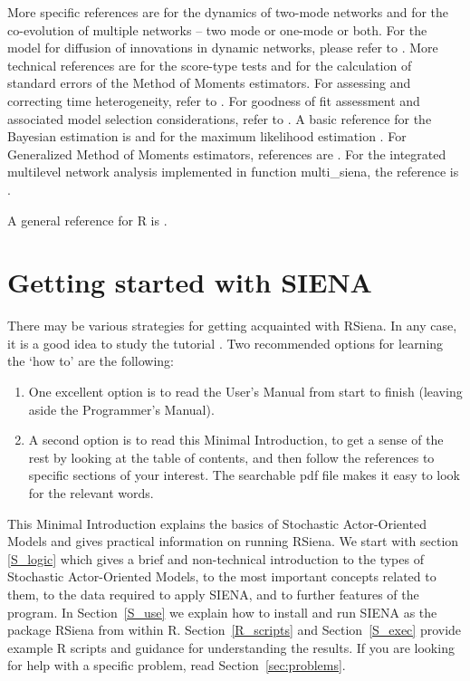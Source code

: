 \documentclass[a4paper,fleqn,11pt]{article}
\newcommand{\+}{\, + \,}
\newcommand{\sfn}[1]{\textsf{#1}}
\newcommand{\R}{{\sf R }}
\newcommand{\Rn}{{\sf R}}
\newcommand{\rs}{{\sf RSiena}}
\newcommand{\RS}{{\sf \textsf{RSiena} }}
\newcommand{\SI}{{\sf SIENA }}
\newcommand{\si}{{\sf SIENA}}
\newcommand{\saom}{{Stochastic Actor-Oriented Model}}
\begin{document}
More specific references are \citet{KoskinenEdling2012} for the
dynamics of two-mode networks and \citet{SLT2013} for the
co-evolution of multiple networks -- two mode or one-mode or both.
For the model for diffusion of innovations in dynamic networks,
please refer to \citet{Greenan15}.
More technical references are
\citet{Schweinberger12} for the score-type tests
and \citet{SchweinbergerSnijders07a} for the calculation of
standard errors of the Method of Moments estimators.
For assessing and correcting time heterogeneity, refer to
\citet*{Lospinoso2011}.
For goodness of fit assessment and associated model
selection considerations, refer to \citet{LospinosoSnijders2019}.
A basic reference for the Bayesian estimation is \citet{KoskinenSnijders07}
and for the maximum likelihood estimation \citet*{SnijdersEA10a}.
For Generalized Method of Moments estimators,
references are \citet*{ASS2015,ASS2019}.
For the integrated multilevel network analysis implemented
in function \sfn{multi\_siena}, the reference is \citet{KoskinenSnijders2023}.
\smallskip

A general reference for \R is \citet{R}.


\newpage

\section{Getting started with \SI}
\label{S_minsi1}

There may be various strategies for getting acquainted with \rs.
In any case, it is a good idea to study the tutorial  \citet{SnijdersEA10b}.
Two recommended options for learning the `how to' are the following:
\begin{enumerate}
\item One excellent option is to read the User's Manual
from start to finish (leaving aside the Programmer's Manual).
\item A second option is to read this Minimal Introduction, to get a sense
 of the rest by looking at the table of contents, and then follow
			the references to specific sections of your interest.
  The searchable pdf file makes it easy to look for the relevant words.
\end{enumerate}

\noindent
This Minimal Introduction explains the basics of {\saom}s
and gives practical information on running \rs.
We start with section \ref{S_logic} which gives a brief and non-technical
introduction to the types of {\saom}s, to the most important concepts related
to them, to the data required to apply \si, and to further features of the program.
In Section~\ref{S_use} we explain how to install and run \SI
as the package \RS from within \Rn. Section~\ref{R_scripts} and
Section~\ref{S_exec} provide example \R scripts and guidance for
understanding the results.
If you are looking for help with a specific problem, read
Section~\ref{sec:problems}.
\end{document}
